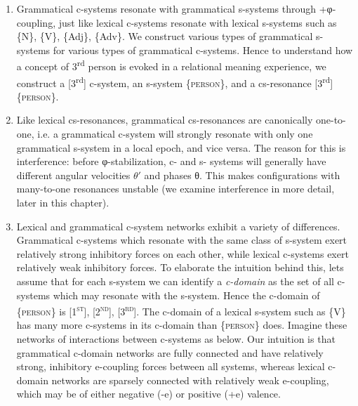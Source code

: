 \begin{enumerate}

\item Grammatical c-systems resonate with grammatical s-systems through +φ-coupling, just like lexical c-systems resonate with lexical s-systems such as \{N\}, \{V\}, \{Adj\}, \{Adv\}. We construct various types of grammatical s-systems for various types of grammatical c-systems. Hence to understand how a concept of 3\textsuperscript{rd} person is evoked in a relational meaning experience, we construct a [3\textsuperscript{rd}] c-system, an s-system \{\textsc{person}\}, and a cs-resonance [3\textsuperscript{rd}]\{\textsc{person}\}. 

\item Like lexical cs-resonances, grammatical cs-resonances are canonically one-to-one, i.e. a grammatical c-system will strongly resonate with only one grammatical s-system in a local epoch, and vice versa. The reason for this is interference: before φ-stabilization, c- and s- systems will generally have different angular velocities $\theta ′$ and phases θ. This makes configurations with many-to-one resonances unstable (we examine interference in more detail, later in this chapter).

\item Lexical and grammatical c-system networks exhibit a variety of differences. Grammatical c-systems which resonate with the same class of s-system exert relatively strong inhibitory forces on each other, while lexical c-systems exert relatively weak inhibitory forces. To elaborate the intuition behind this, lets assume that for each s-system we can identify a \textit{c-domain} as the set of all c-systems which may resonate with the s-system. Hence the c-domain of \{\textsc{person}\} is [\textsc{1}\textsc{\textsuperscript{st}}], [\textsc{2}\textsc{\textsuperscript{nd}}], [\textsc{3}\textsc{\textsuperscript{rd}}]. The c-domain of a lexical s-system such as \{V\} has many more c-systems in its c-domain than \{\textsc{person}\} does. Imagine these networks of interactions between c-systems as below. Our intuition is that grammatical c-domain networks are fully connected and have relatively strong, inhibitory e-coupling forces between all systems, whereas lexical c-domain networks are sparsely connected with relatively weak e-coupling, which may be of either negative (-e) or positive (+e) valence.


\end{enumerate}
